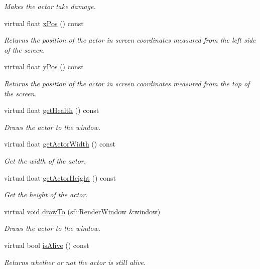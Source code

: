 \begin{DoxyCompactItemize}
\begin{DoxyCompactList}\small\item\em Makes the actor take damage. \end{DoxyCompactList}\item 
virtual float \mbox{\hyperlink{classRose_1_1Character_1_1Actor_a0668a9c0c457d1c45e709b48111ba79d}{x\+Pos}} () const
\begin{DoxyCompactList}\small\item\em Returns the position of the actor in screen coordinates measured from the left side of the screen. \end{DoxyCompactList}\item 
virtual float \mbox{\hyperlink{classRose_1_1Character_1_1Actor_a967b03cbbd0be4e1761cf3e99f4bb207}{y\+Pos}} () const
\begin{DoxyCompactList}\small\item\em Returns the position of the actor in screen coordinates measured from the top of the screen. \end{DoxyCompactList}\item 
virtual float \mbox{\hyperlink{classRose_1_1Character_1_1Actor_a8de428b4a1c3cae77a506f1e9a9125f1}{get\+Health}} () const
\begin{DoxyCompactList}\small\item\em Draws the actor to the window. \end{DoxyCompactList}\item 
virtual float \mbox{\hyperlink{classRose_1_1Character_1_1Actor_a903e41f008d672f0c47e672d9cad1221}{get\+Actor\+Width}} () const
\begin{DoxyCompactList}\small\item\em Get the width of the actor. \end{DoxyCompactList}\item 
virtual float \mbox{\hyperlink{classRose_1_1Character_1_1Actor_aa277151a54544a2161d8ea1b4e4b5a41}{get\+Actor\+Height}} () const
\begin{DoxyCompactList}\small\item\em Get the height of the actor. \end{DoxyCompactList}\item 
virtual void \mbox{\hyperlink{classRose_1_1Character_1_1Actor_a1433ef76e892a8c57597115071c256d8}{draw\+To}} (sf\+::\+Render\+Window \&window)
\begin{DoxyCompactList}\small\item\em Draws the actor to the window. \end{DoxyCompactList}\item 
virtual bool \mbox{\hyperlink{classRose_1_1Character_1_1Actor_adda43e4e628cbfb11c36ab909aceba89}{is\+Alive}} () const
\begin{DoxyCompactList}\small\item\em Returns whether or not the actor is still alive. \end{DoxyCompactList}\end{DoxyCompactItemize}
